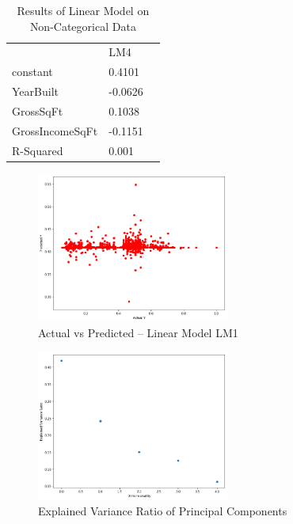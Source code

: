 \documentclass[10pt,twocolumn]{article}
\begin{document}
\begin{table}[]
\centering
\caption{Results of Linear Model on Non-Categorical Data}
\label{my-label}
\begin{tabular}{lll}
                & LM4        &  \\
constant        & 0.4101     &  \\
YearBuilt       & -0.0626    &  \\
GrossSqFt       & 0.1038     &  \\
GrossIncomeSqFt & -0.1151 &  \\
R-Squared       & 0.001     &
\end{tabular}
\end{table}

\begin{figure}[]
  \begin{center}
    \includegraphics[width=2.5in]{figure1.png}
  \end{center}

  \caption{\small Actual vs Predicted -- Linear Model LM1}
  \label{fig-1}
\end{figure}

\begin{figure}[!t]
  \begin{center}
    \includegraphics[width=2.5in]{figure2.png}
  \end{center}

  \caption{\small Explained Variance Ratio of Principal Components}
  \label{fig-2}
\end{figure}
\end{document}
